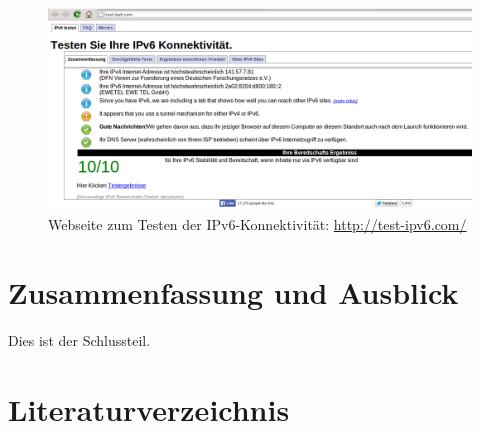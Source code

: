 \documentclass[a4paper,12pt]{scrartcl}
\begin{document}
\begin{figure}[htb]
\begin{center}
 \includegraphics[width=1\hsize]{./images/testipv6.png}
 \end{center}
\caption[Webseite zum Testen der IPv6-Konnektivit\"at: \url{http://test-ipv6.com/}]{\label{testipv6}Webseite zum Testen der IPv6-Konnektivit\"at: \url{http://test-ipv6.com/}}
\end{figure}




\clearpage
\section{Zusammenfassung und Ausblick}
Dies ist der Schlussteil.
\clearpage
 
\section{Literaturverzeichnis}
\end{document}
